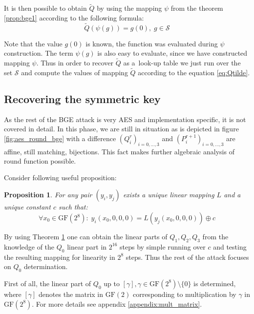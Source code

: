 \documentclass[11pt,oneside,final]{fithesis2}
\newtheorem{myprop}{Proposition}
\newcommand{\gfe}{\ensuremath{\text{GF}\left(2^8\right)}}
\newcommand{\gf}{\ensuremath{\text{GF}\left(2\right)}}
\begin{document}
    It is then possible to obtain $\widetilde{Q}$ by using the mapping $\psi$ from the theorem \ref{prop:bge1} according to the following formula:
    \begin{equation}\label{eq:Qtilde}
     \widetilde{Q}\left(\psi\left(g\right)\right) = g\left(0\right),\; g \in \mathcal{S}
    \end{equation}
    
    Note that the value $g\left(0\right)$ is known, the function was evaluated during $\psi$ construction. The term $\psi\left(g\right)$ is also easy to
    evaluate, since we have constructed mapping $\psi$. Thus in order to recover $\widetilde{Q}$ as a~look-up table we just run over the set $\mathcal{S}$
    and compute the values of mapping $\widetilde{Q}$ according to the equation \ref{eq:Qtilde}.
    
    \subsection{Recovering the symmetric key}
    As the rest of the BGE attack is very AES and implementation specific, it is not covered in detail. In this phase, we are still in situation as
    is depicted in figure \ref{fig:aes_round_bge} with a difference $\left(Q^r_i\right)_{i=0,\dots,3}$ and $\left(P^{r+1}_i\right)_{i=0,\dots,3}$
    are affine, still matching, bijections. This fact makes further algebraic analysis of round function possible.
    
    Consider following useful proposition:
    \begin{myprop}\label{prop:bge_prop1}
     For any pair $\left(y_i, y_j\right)$ exists a unique linear mapping $L$ and a unique constant $c$ such that:
     \begin{equation}
	\forall x_0 \in \gfe:\; y_i\left(x_0, 0, 0, 0\right) = L \left(y_j \left(x_0, 0, 0, 0 \right) \right) \oplus c
     \end{equation}
    \end{myprop}
    
    By using Theorem \ref{prop:bge_prop1} one can obtain the linear parts of $Q_1, Q_2, Q_3$ from the knowledge of the $Q_0$ linear part in $2^{16}$ steps by simple
    running over $c$ and testing the resulting mapping for linearity in $2^8$ steps. Thus the rest of the attack focuses on $Q_0$ determination.
    
    First of all, the linear part of $Q_0$ up to $\left[\gamma\right], \gamma \in \gfe \setminus \{0\}$ is determined, where $\left[\gamma\right]$ denotes the
    matrix in $\gf$ corresponding to multiplication by $\gamma$ in $\gfe$. For more details see appendix \ref{appendix:mult_matrix}.
    
\end{document}
